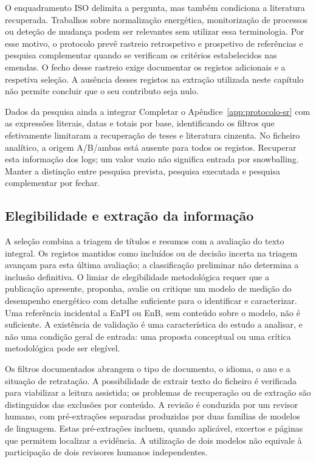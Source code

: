 O enquadramento ISO delimita a pergunta, mas também condiciona a
literatura recuperada. Trabalhos sobre normalização energética,
monitorização de processos ou deteção de mudança podem ser relevantes
sem utilizar essa terminologia. Por esse motivo, o protocolo prevê
rastreio retrospetivo e prospetivo de referências e pesquisa complementar
quando se verificam os critérios estabelecidos nas emendas. O fecho desse
rastreio exige documentar os registos adicionais e a respetiva seleção.
A ausência desses registos na extração utilizada neste capítulo não
permite concluir que o seu contributo seja nulo.

{Dados da pesquisa ainda a integrar}
{Completar o Apêndice~\ref{app:protocolo-sr} com as expressões literais,
datas e totais por base, identificando os filtros que efetivamente
limitaram a recuperação de teses e literatura cinzenta. No ficheiro
analítico, a origem A/B/ambas está ausente para todos os registos.
Recuperar esta informação dos logs; um valor vazio não significa
entrada por snowballing. Manter a distinção entre pesquisa prevista,
pesquisa executada e pesquisa complementar por fechar.}%

\subsection{Elegibilidade e extração da informação}

A seleção combina a triagem de títulos e resumos com a avaliação do
texto integral. Os registos mantidos como incluídos ou de decisão
incerta na triagem avançam para esta última avaliação; a classificação
preliminar não determina a inclusão definitiva. O limiar de elegibilidade
metodológica requer que a publicação apresente, proponha, avalie ou
critique um modelo de medição do desempenho energético com detalhe
suficiente para o identificar e caracterizar. Uma referência incidental
a EnPI ou EnB, sem conteúdo sobre o modelo, não é suficiente. A existência
de validação é uma característica do estudo a analisar, e não uma
condição geral de entrada: uma proposta conceptual ou uma crítica
metodológica pode ser elegível.

Os filtros documentados abrangem o tipo de documento, o idioma, o ano
e a situação de retratação. A possibilidade de extrair texto do ficheiro
é verificada para viabilizar a leitura assistida; os problemas de
recuperação ou de extração são distinguidos das exclusões por conteúdo.
A revisão é conduzida por um revisor humano, com pré-extrações separadas
produzidas por duas famílias de modelos de linguagem. Estas pré-extrações
incluem, quando aplicável, excertos e páginas que permitem localizar a
evidência. A utilização de dois modelos não equivale à participação de
dois revisores humanos independentes.

